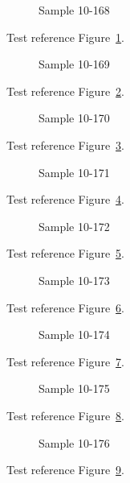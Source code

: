 \begin{figure}[tbhp]
\caption{Sample 10-168}
\label{fig:sample-10-168}
\end{figure}

Test reference Figure~\ref{fig:sample-10-168}.

\begin{figure}[tbhp]
\caption{Sample 10-169}
\label{fig:sample-10-169}
\end{figure}

Test reference Figure~\ref{fig:sample-10-169}.

\begin{figure}[tbhp]
\caption{Sample 10-170}
\label{fig:sample-10-170}
\end{figure}

Test reference Figure~\ref{fig:sample-10-170}.

\begin{figure}[tbhp]
\caption{Sample 10-171}
\label{fig:sample-10-171}
\end{figure}

Test reference Figure~\ref{fig:sample-10-171}.

\begin{figure}[tbhp]
\caption{Sample 10-172}
\label{fig:sample-10-172}
\end{figure}

Test reference Figure~\ref{fig:sample-10-172}.

\begin{figure}[tbhp]
\caption{Sample 10-173}
\label{fig:sample-10-173}
\end{figure}

Test reference Figure~\ref{fig:sample-10-173}.

\begin{figure}[tbhp]
\caption{Sample 10-174}
\label{fig:sample-10-174}
\end{figure}

Test reference Figure~\ref{fig:sample-10-174}.

\begin{figure}[tbhp]
\caption{Sample 10-175}
\label{fig:sample-10-175}
\end{figure}

Test reference Figure~\ref{fig:sample-10-175}.

\begin{figure}[tbhp]
\caption{Sample 10-176}
\label{fig:sample-10-176}
\end{figure}

Test reference Figure~\ref{fig:sample-10-176}.


